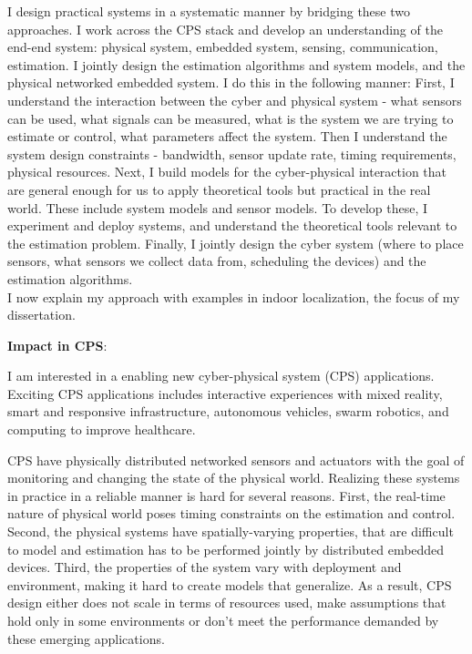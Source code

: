 \documentclass[10pt]{article}
\begin{document}
I design practical systems in a systematic manner by bridging these two approaches. I work across the CPS stack and develop an understanding of the end-end system: physical system, embedded system, sensing, communication, estimation. I jointly design the estimation algorithms and system models, and the physical networked embedded system. I do this in the following manner: First, I understand the interaction between the cyber and physical system - what sensors can be used, what signals can be measured, what is the system we are trying to estimate or control, what parameters affect the system. Then I understand the system design constraints - bandwidth, sensor update rate, timing requirements, physical resources. Next, I build models for the cyber-physical interaction that are general enough for us to apply theoretical tools but practical in the real world. These include system models and sensor models. To develop these, I experiment and deploy systems, and understand the theoretical tools relevant to the estimation problem. Finally, I jointly design the cyber system (where to place sensors, what sensors we collect data from, scheduling the devices) and the estimation algorithms.\\

I now explain my approach with examples in indoor localization, the focus of my dissertation. 

\textbf{Impact in CPS}:\\






\newpage

I am interested in a enabling new cyber-physical system (CPS) applications. Exciting CPS applications includes interactive experiences with mixed reality, smart and responsive infrastructure, autonomous vehicles, swarm robotics, and computing to improve healthcare.

CPS have physically distributed networked sensors and actuators with the goal of monitoring and changing the state of the physical world. Realizing these systems in practice in a reliable manner is hard for several reasons. First, the real-time nature of physical world poses timing constraints on the estimation and control. Second, the physical systems have spatially-varying properties, that are difficult to model and estimation has to be performed jointly by distributed embedded devices. Third, the properties of the system vary with deployment and environment, making it hard to create models that generalize. As a result, CPS design either does not scale in terms of resources used, make assumptions that hold only in some environments or don't meet the performance demanded by these emerging applications.\\
\end{document}
